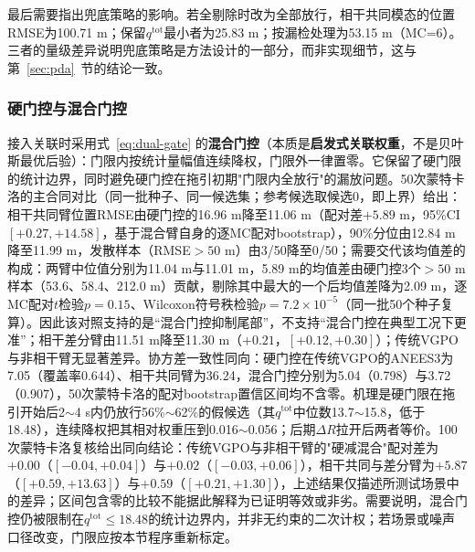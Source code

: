 \documentclass[UTF8,a4paper,zihao=-4]{ctexart}
\begin{document}
最后需要指出兜底策略的影响。若全剔除时改为全部放行，相干共同模态的位置RMSE为100.71 m；保留\(q^{\mathrm{tot}}\)最小者为25.83 m；按漏检处理为53.15 m（MC=6）。三者的量级差异说明兜底策略是方法设计的一部分，而非实现细节，这与第~\ref{sec:pda}~节的结论一致。



\subsubsection{硬门控与混合门控}\label{sec:hard-mixed}
接入关联时采用式~\eqref{eq:dual-gate} 的\textbf{混合门控}（本质是\textbf{启发式关联权重}，不是贝叶斯最优后验）：门限内按统计量幅值连续降权，门限外一律置零。它保留了硬门限的统计边界，同时避免硬门控在拖引初期"门限内全放行"的漏放问题。50次蒙特卡洛的主合同对比（同一批种子、同一候选集；参考候选取候选0，即上界）给出：相干共同臂位置RMSE由硬门控的16.96 m降至11.06 m（配对差\(+5.89\) m，95\%CI \([+0.27,+14.58]\)，基于混合臂自身的逐MC配对bootstrap），90\%分位由12.84 m降至11.99 m，发散样本（RMSE\(>50\) m）由3/50降至0/50；需要交代该均值差的构成：两臂中位值分别为11.04 m与11.01 m，5.89 m的均值差由硬门控3个\(>50\) m样本（53.6、58.4、212.0 m）贡献，剔除其中最大的一个后均值差降为2.09 m，逐MC配对\(t\)检验\(p=0.15\)、Wilcoxon符号秩检验\(p=7.2\times10^{-5}\)（同一批50个种子复算）。因此该对照支持的是“混合门控抑制尾部”，不支持“混合门控在典型工况下更准”；相干差分臂由11.51 m降至11.30 m（\(+0.21\)，\([+0.12,+0.30]\)）；传统VGPO与非相干臂无显著差异。协方差一致性同向：硬门控在传统VGPO的ANEES3为7.05（覆盖率0.644）、相干共同臂为36.24，混合门控分别为5.04（0.798）与3.72（0.907），50次蒙特卡洛的配对bootstrap置信区间均不含零。机理是硬门限在拖引开始后2\(\sim\)4 s内仍放行56\%\(\sim\)62\%的假候选（其\(q^{\mathrm{tot}}\)中位数13.7\(\sim\)15.8，低于18.48），连续降权把其相对权重压到0.016\(\sim\)0.056；后期\(\Delta R\)拉开后两者等价。100次蒙特卡洛复核给出同向结论：传统VGPO与非相干臂的"硬减混合"配对差为\(+0.00\)（\([-0.04,+0.04]\)）与\(+0.02\)（\([-0.03,+0.06]\)），相干共同与差分臂为\(+5.87\)（\([+0.59,+13.63]\)）与\(+0.59\)（\([+0.21,+1.30]\)），上述结果仅描述所测试场景中的差异；区间包含零的比较不能据此解释为已证明等效或非劣。需要说明，混合门控仍被限制在\(q^{\mathrm{tot}}\le18.48\)的统计边界内，并非无约束的二次计权；若场景或噪声口径改变，门限应按本节程序重新标定。
\end{document}
